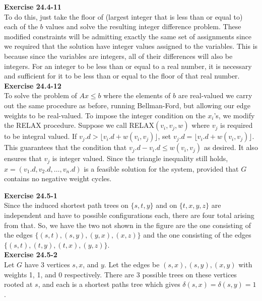 \documentclass{article}
\begin{document}
\noindent\textbf{Exercise 24.4-11}\\

To do this, just take the floor of (largest integer that is less than or equal to) each of the $b$ values and solve the resulting integer difference problem. These modified constraints will be admitting exactly the same set of assignments since we required that the solution have integer values assigned to the variables. This is because since the variables are integers, all of their differences will also be integers. For an integer to be less than or equal to a real number, it is necessary and sufficient for it to be less than or equal to the floor of that real number.\\

\noindent\textbf{Exercise 24.4-12}\\

To solve the problem of $Ax \leq b$ where the elements of $b$ are real-valued we carry out the same procedure as before, running Bellman-Ford, but allowing our edge weights to be real-valued. To impose the integer condition on the $x_i$'s, we modify the RELAX procedure.   Suppose we call RELAX$(v_i,v_j,w)$ where $v_j$ is required to be integral valued.  If $v_j.d > \lfloor v_i.d + w(v_i,v_j)\rfloor$, set $v_j.d = \lfloor v_i.d + w(v_i,v_j) \rfloor$.  This guarantees that the condition that $v_j.d - v_i.d \leq w(v_i,v_j)$ as desired.  It also ensures that $v_j$ is integer valued. Since the triangle inequality still holds, $x = (v_1.d, v_2.d, \ldots, v_n.d)$ is a feasible solution for the system, provided that $G$ contains no negative weight cycles.

\noindent\textbf{Exercise 24.5-1}\\

Since the induced shortest path trees on $\{s,t,y\}$ and on $\{t,x,y,z\}$ are independent and have to possible configurations each, there are four total arising from that. So, we have the two not shown in the figure are the one consisting of the edges $\{(s,t),(s,y),(y,x),(x,z)\}$ and the one consisting of the edges $\{(s,t),(t,y),(t,x),(y,z)\}$.\\

\noindent\textbf{Exercise 24.5-2}\\

Let $G$ have 3 vertices $s, x$, and $y$. Let the edges be $(s,x), (s,y), (x,y)$ with weights 1, 1, and 0 respectively.  There are 3 possible trees on these vertices rooted at $s$, and each is a shortest paths tree which gives $\delta(s,x) = \delta(s,y) = 1$. \\
\end{document}
